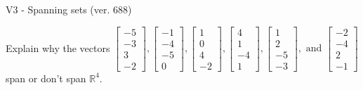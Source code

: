 \begin{exercise}
  \begin{exerciseTitle}V3 - Spanning sets (ver. 688)\end{exerciseTitle}
  \begin{exerciseStatement}
    Explain why the vectors \(\left[\begin{array}{r}
-5 \\
-3 \\
3 \\
-2
\end{array}\right] , \left[\begin{array}{r}
-1 \\
-4 \\
-5 \\
0
\end{array}\right] , \left[\begin{array}{r}
1 \\
0 \\
4 \\
-2
\end{array}\right] , \left[\begin{array}{r}
4 \\
1 \\
-4 \\
1
\end{array}\right] , \left[\begin{array}{r}
1 \\
2 \\
-5 \\
-3
\end{array}\right] , \text{ and } \left[\begin{array}{r}
-2 \\
-4 \\
2 \\
-1
\end{array}\right]\) span or don't span \(\mathbb{R}^4\). 
	



\end{exerciseStatement}
\end{exercise}
